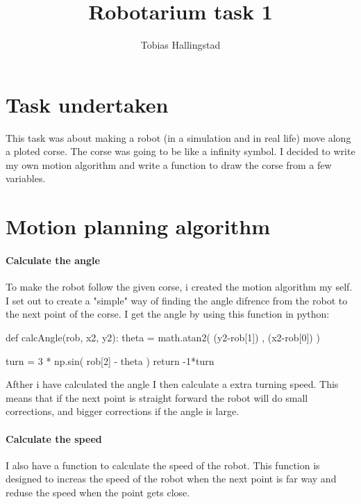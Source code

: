 \documentclass{article}
\title{Robotarium task 1}
\author{Tobias Hallingstad}
\begin{document}
    \maketitle


    \section{Task undertaken}
    This task was about making a robot (in a simulation and in real life) move along a ploted corse. The corse was going to be like a infinity symbol. I decided to write my own motion algorithm and write a function to draw the corse from a few variables. 

    \section{Motion planning algorithm}
    
    \paragraph{Calculate the angle}
        To make the robot follow the given corse, i created the motion algorithm my self. I set out to create a "simple" way of finding the angle difrence from the robot to the next point of the corse. I get the angle by using this function in python:

        \begin{pythoncode}
    def calcAngle(rob, x2, y2):
        theta = math.atan2( (y2-rob[1]) , (x2-rob[0]) )

        turn = 3 * np.sin( rob[2] - theta ) 
        return -1*turn
        \end{pythoncode}

        
        Afther i have calculated the angle I then calculate a extra turning speed. This means that if the next point is straight forward the robot will do small corrections, and bigger corrections if the angle is large.

    \paragraph{Calculate the speed}
        I also have a function to calculate the speed of the robot. This function is designed to increas the speed of the robot when the next point is far way and reduse the speed when the point gets close.
\end{document}
